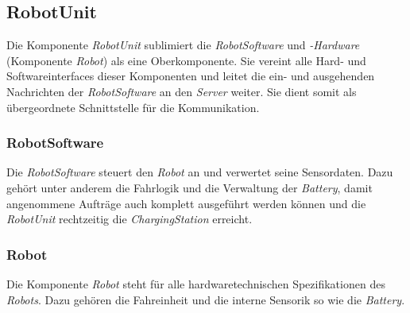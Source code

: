 \subsection{RobotUnit}

Die Komponente \emph{RobotUnit} sublimiert die \emph{RobotSoftware} und \emph{-Hardware} (Komponente \emph{Robot}) als eine Oberkomponente. Sie vereint alle Hard- und Softwareinterfaces dieser Komponenten und leitet die ein- und ausgehenden Nachrichten der \emph{RobotSoftware} an den \emph{Server} weiter. Sie dient somit als \"{u}bergeordnete Schnittstelle f\"{u}r die Kommunikation. 

\subsubsection{RobotSoftware}

Die \emph{RobotSoftware} steuert den \emph{Robot} an und verwertet seine Sensordaten. Dazu geh\"{o}rt unter anderem die Fahrlogik und die Verwaltung der \emph{Battery}, damit angenommene Aufträge auch komplett ausgef\"{u}hrt werden k\"{o}nnen und die \emph{RobotUnit} rechtzeitig die \emph{ChargingStation} erreicht. 

\subsubsection{Robot}

Die Komponente \emph{Robot} steht f\"{u}r alle hardwaretechnischen Spezifikationen des \emph{Robots}. Dazu geh\"{o}ren die Fahreinheit und die interne Sensorik so wie die \emph{Battery}.   